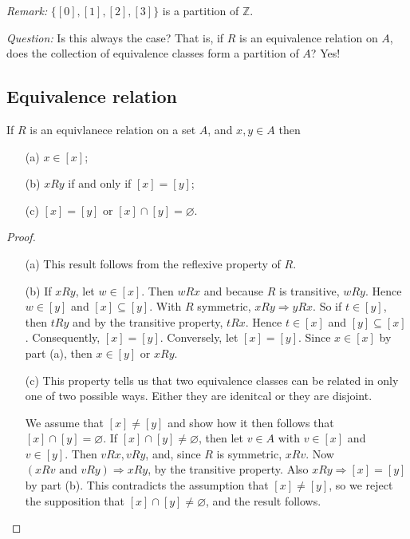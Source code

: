 \documentclass[11pt]{article}
\let\emptyset\varnothing
\begin{document}
    \emph{Remark:} \(\{[0],[1],[2],[3]\}\) is a partition of \(\mathbb{Z}\). 

    \vspace{1em}

    \emph{Question:} Is this always the case? That is, if $R$ is an equivalence relation on $A$, does the collection of equivalence classes form a partition of $A$? Yes!

    \subsection{Equivalence relation}

    If $R$ is an equivlanece relation on a set $A$, and \(x,y \in A\) then 
    \begin{enumerate}
        \item[(a)] \(x \in [x]\);
        \item[(b)] \(xRy\) if and only if \([x] = [y]\);
        \item[(c)] \([x] = [y]\) or \([x] \cap [y] = \emptyset\).   
    \end{enumerate}

    \begin{proof}
        \begin{enumerate}
            \item[(a)] This result follows from the reflexive property of $R$.
            \item[(b)] If \(xRy\), let \(w \in [x]\). Then \(w  R x\) and because $R$ is transitive, \(w R y\). Hence \(w \in [y]\) and \([x] \subseteq [y]\). With $R$ symmetric, \(xRy \Rightarrow yRx\). So if \(t \in [y]\), then \(t R y\) and by the transitive property, \(t R x\). Hence \(t \in [x]\) and \([y] \subseteq [x]\). Consequently, \([x] = [y]\). Conversely, let \([x] = [y]\). Since \(x \in [x]\) by part (a), then \(x \in [y]\) or \(x R y\).   
            \item[(c)] This property tells us that two equivalence classes can be related in only one of two possible ways. Either they are idenitcal or they are disjoint.
            
            We assume that \([x] \neq [y]\) and show how it then follows that \([x] \cap [y] = \emptyset\). If \([x] \cap [y] \neq \emptyset\), then let \(v \in A\) with \(v \in [x]\) and \(v \in [y]\). Then \(v R x, v R y\), and, since $R$ is symmetric, \(x R v\). Now \((xRv \text{ and } v R y) \Rightarrow x R y\), by the transitive property. Also \(xRy \Rightarrow [x] = [y]\) by part (b). This contradicts the assumption that \([x] \neq [y]\), so we reject the supposition that \([x] \cap [y] \neq \emptyset\), and the result follows.
        \end{enumerate}
    \end{proof}
\end{document}
